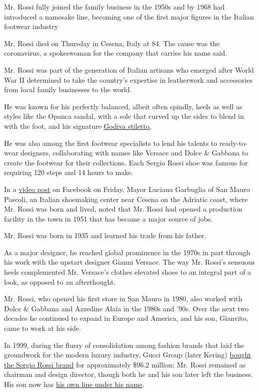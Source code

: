Mr. Rossi fully joined the family business in the 1950s and by 1968 had
introduced a namesake line, becoming one of the first major figures in
the Italian footwear industry

Mr. Rossi died on Thursday in Cesena, Italy at 84. The cause was the
coronavirus, a spokeswoman for the company that carries his name said.

Mr. Rossi was part of the generation of Italian artisans who emerged
after World War II determined to take the country's expertise in
leatherwork and accessories from local family businesses to the world.

He was known for his perfectly balanced, albeit often spindly, heels as
well as styles like the Opanca sandal, with a sole that curved up the
sides to blend in with the foot, and his signature
\href{https://www.farfetch.com/shopping/women/sergio-rossi-godiva-stiletto-pumps-item-12546784.aspx}{Godiva
stiletto},

He was also among the first footwear specialists to lend his talents to
ready-to-wear designers, collaborating with names like Versace and Dolce
\& Gabbana to create the footwear for their collections. Each Sergio
Rossi shoe was famous for requiring 120 steps and 14 hours to make.

In a
\href{https://www.facebook.com/lucianagarbugliasindaco/videos/1111139359247799/?q=Luciana\%20Garbuglia}{video
post} on Facebook on Friday, Mayor Luciana Garbuglia of San Mauro
Pascoli, an Italian shoemaking center near Cesena on the Adriatic coast,
where Mr. Rossi was born and lived, noted that Mr. Rossi had opened a
production facility in the town in 1951 that has became a major source
of jobs.

Mr. Rossi was born in 1935 and learned his trade from his father.

As a major designer, he reached global prominence in the 1970s in part
through his work with the upstart designer Gianni Versace. The way Mr.
Rossi's sensuous heels complemented Mr. Versace's clothes elevated shoes
to an integral part of a look, as opposed to an afterthought.

Mr. Rossi, who opened his first store in San Mauro in 1980, also worked
with Dolce \& Gabbana and Azzedine Alaïa in the 1980s and '90s. Over the
next two decades he continued to expand in Europe and America, and his
son, Gianvito, came to work at his side.

In 1999, during the flurry of consolidation among fashion brands that
laid the groundwork for the modern luxury industry, Gucci Group (later
Kering) \href{https://www.wsj.com/articles/SB942941056103661531}{bought
the Sergio Rossi brand} for approximately \$96.2 million; Mr. Rossi
remained as chairman and design director, though both he and his son
later left the business. His son now has
\href{https://www.gianvitorossi.com/us_en/}{his own line under his
name}.

